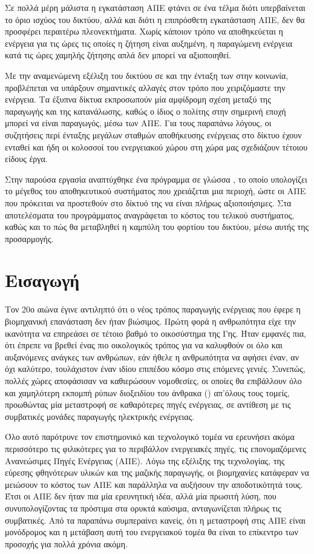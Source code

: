 \documentclass[12pt]{report}
\begin{document}
Σε πολλά μέρη μάλιστα η εγκατάσταση ΑΠΕ φτάνει σε ένα τέλμα διότι υπερβαίνεται το όριο ισχύος του δικτύου, αλλά και διότι η επιπρόσθετη εγκατάσταση ΑΠΕ, δεν θα προσφέρει περαιτέρω πλεονεκτήματα. Χωρίς κάποιον τρόπο να αποθηκεύεται
η ενέργεια για τις ώρες τις οποίες η ζήτηση είναι αυξημένη, η παραγώμενη ενέργεια κατά τις ώρες χαμηλής ζήτησης απλά δεν μπορεί να αξιοποιηθεί. 

Με την αναμενώμενη εξέλιξη του δικτύου σε {} και την ένταξη των {} στην κοινωνία, προβλέπεται να υπάρξουν σημαντικές αλλαγές στον τρόπο που χειριζόμαστε την ενέργεια. Τα έξυπνα δίκτυα 
εκπροσωπούν μία αμφίδρομη σχέση μεταξύ της παραγωγής και της κατανάλωσης, καθώς ο ίδιος ο πολίτης στην σημερινή εποχή μπορεί να είναι παραγωγός, μέσω των ΑΠΕ. Για τους παραπάνω λόγους, οι συζητήσεις περί ένταξης μεγάλων σταθμών 
αποθήκευσης ενέργειας στο δίκτυο έχουν ενταθεί και ήδη οι κολοσσοί του ενεργειακού χώρου στη χώρα μας σχεδιάζουν τέτοιου είδους έργα. 

Στην παρούσα εργασία αναπτύχθηκε ένα πρόγραμμα σε γλώσσα {}, το οποίο υπολογίζει το μέγεθος του αποθηκευτικού συστήματος που χρειάζεται μια περιοχή, ώστε οι ΑΠΕ που πρόκειται να προστεθούν στο δίκτυό της να είναι
πλήρως αξιοποιήσιμες. Στα αποτελέσματα του προγράμματος αναγράφεται το κόστος του τελικού συστήματος, καθώς και το πώς θα μεταβληθεί η καμπύλη του φορτίου του δικτύου, μέσω αυτής της προσαρμογής.
\chapter*{Εισαγωγή}
Τον 20ο αιώνα έγινε αντιληπτό ότι ο νέος τρόπος παραγωγής ενέργειας που έφερε η βιομηχανική επανάσταση δεν ήταν βιώσιμος. Πρώτη φορά η ανθρωπότητα είχε την ικανότητα να επηρεάσει σε τέτοιο βαθμό το οικοσύστημα της Γης. Ήταν εμφανές 
πια, ότι έπρεπε να βρεθεί ένας πιο οικολογικός τρόπος για να καλυφθούν οι όλο και αυξανόμενες ανάγκες των ανθρώπων, εάν ήθελε η ανθρωπότητα να αφήσει έναν, αν όχι καλύτερο, τουλάχιστον έναν ιδίου επιπέδου κόσμο στις επόμενες γενιές.
Συνεπώς, πολλές χώρες αποφάσισαν να καθιερώσουν νομοθεσίες, οι οποίες θα επιβάλλουν όλο και χαμηλότερη εκπομπή ρύπων διοξειδίου του άνθρακα ({}) απ'όλους τους τομείς, προωθώντας μία μεταστροφή σε καθαρότερες πηγές ενέργειας, σε αντίθεση με τις συμβατικές μονάδες παραγωγής ηλεκτρικής ενέργειας. 

Όλο αυτό παρότρυνε τον επιστημονικό και τεχνολογικό τομέα να ερευνήσει ακόμα περισσότερο τις φιλικότερες για το περιβάλλον ενεργειακές πηγές, τις επονομαζόμενες 
Ανανεώσιμες Πηγές Ενέργειας (ΑΠΕ). Λόγω της εξέλιξης της τεχνολογίας, της εύρεσης φθηνότερων υλικών και της μαζικής παραγωγής, οι βιομηχανίες κατάφεραν να μειώσουν το κόστος των ΑΠΕ και παράλληλα να αυξήσουν την αποδοτικότητά τους.
Έτσι οι ΑΠΕ δεν ήταν πια μία ερευνητική ιδέα, αλλά μία πρωσιτή λύση, που συνυπολογίζοντας τα πρόστιμα στα ορυκτά καύσιμα, ανταγωνίζεται πλήρως τις συμβατικές. Από τα παραπάνω συμπεραίνει κανείς, ότι η μεταστροφή στις ΑΠΕ είναι 
μονόδρομος και η μετάβαση αυτή του ενεργειακού τομέα θα είναι το επίκεντρο των προσοχής για πολλά χρόνια ακόμη.
\end{document}
